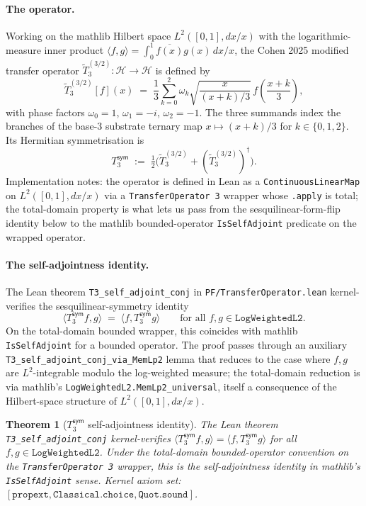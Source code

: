 \documentclass[11pt,a4paper]{amsart}
\theoremstyle{plain}
\newtheorem{theorem}{Theorem}[section]
\theoremstyle{definition}
\begin{document}
\paragraph{The operator.} Working on the mathlib Hilbert space $L^2([0,1], dx/x)$ with the logarithmic-measure inner product $\langle f, g \rangle = \int_0^1 \overline{f(x)} g(x) \, dx/x$, the Cohen 2025 modified transfer operator $\widetilde{T}_3^{(3/2)} \colon \mathcal{H} \to \mathcal{H}$ is defined by~\cite{cohen2025transferOp}
\[
\widetilde{T}_3^{(3/2)}[f](x) \;=\; \frac{1}{3} \sum_{k=0}^{2} \omega_k \sqrt{\frac{x}{(x+k)/3}} \, f\!\left(\frac{x+k}{3}\right),
\]
with phase factors $\omega_0 = 1$, $\omega_1 = -i$, $\omega_2 = -1$. The three summands index the branches of the base-3 substrate ternary map $x \mapsto (x+k)/3$ for $k \in \{0, 1, 2\}$. Its Hermitian symmetrisation is
\[
T_3^{\textsf{sym}} \;:=\; \tfrac{1}{2}\bigl(\widetilde{T}_3^{(3/2)} + (\widetilde{T}_3^{(3/2)})^\dagger\bigr).
\]
Implementation notes: the operator is defined in Lean as a \texttt{ContinuousLinearMap} on $L^2([0,1], dx/x)$ via a \texttt{TransferOperator 3} wrapper whose \texttt{.apply} is total; the total-domain property is what lets us pass from the sesquilinear-form-flip identity below to the mathlib bounded-operator \texttt{IsSelfAdjoint} predicate on the wrapped operator.

\paragraph{The self-adjointness identity.} The Lean theorem \texttt{T3\_self\_adjoint\_conj} in \texttt{PF/TransferOperator.lean} kernel-verifies the sesquilinear-symmetry identity
\[
\langle T_3^{\textsf{sym}} f, g \rangle \;=\; \langle f, T_3^{\textsf{sym}} g \rangle \qquad \text{for all } f, g \in \mathtt{LogWeightedL2}.
\]
On the total-domain bounded wrapper, this coincides with mathlib \texttt{IsSelfAdjoint} for a bounded operator. The proof passes through an auxiliary \texttt{T3\_self\_adjoint\_conj\_via\_MemLp2} lemma that reduces to the case where $f, g$ are $L^2$-integrable modulo the log-weighted measure; the total-domain reduction is via mathlib's \texttt{LogWeightedL2.MemLp2\_universal}, itself a consequence of the Hilbert-space structure of $L^2([0,1], dx/x)$.

\begin{theorem}[$T_3^{\textsf{sym}}$ self-adjointness identity]\label{thm:t3sym}
The Lean theorem \texttt{T3\_self\_adjoint\_conj} kernel-verifies $\langle T_3^{\textsf{sym}} f, g \rangle = \langle f, T_3^{\textsf{sym}} g \rangle$ for all $f, g \in \mathtt{LogWeightedL2}$. Under the total-domain bounded-operator convention on the \texttt{TransferOperator 3} wrapper, this is the self-adjointness identity in mathlib's \texttt{IsSelfAdjoint} sense. Kernel axiom set: $[\texttt{propext}, \texttt{Classical.choice}, \texttt{Quot.sound}]$.
\end{theorem}
\end{document}

